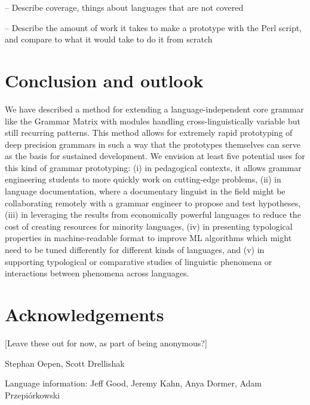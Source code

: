 \documentclass[11pt]{article}
\begin{document}
-- Describe coverage, things about languages that are not covered

-- Describe the amount of work it takes to make a prototype with the
Perl script, and compare to what it would take to do it from scratch

\section{Conclusion and outlook}

We have described a method for extending a language-independent core
grammar like the Grammar Matrix with modules handling
cross-linguistically variable but still recurring patterns.  This
method allows for extremely rapid prototyping of deep precision
grammars in such a way that the prototypes themselves can serve as the
basis for sustained development.  We envision at least five potential
uses for this kind of grammar prototyping: (i) in pedagogical
contexts, it allows grammar engineering students to more quickly work
on cutting-edge problems, (ii) in language documentation, where a
documentary linguist in the field might be collaborating remotely with
a grammar engineer to propose and test hypotheses, (iii) in leveraging
the results from economically powerful languages to reduce the cost of
creating resources for minority languages, (iv) in presenting
typological properties in machine-readable format to improve ML
algorithms which might need to be tuned differently for different
kinds of languages, and (v) in supporting typological or comparative
studies of linguistic phenomena or interactions between phenomena across
languages.


\section*{Acknowledgements}

[Leave these out for now, as part of being anonymous?]

Stephan Oepen, Scott Drellishak

Language information: Jeff Good, Jeremy Kahn, Anya Dormer, Adam Przepi\'orkowski



%

\end{document}

